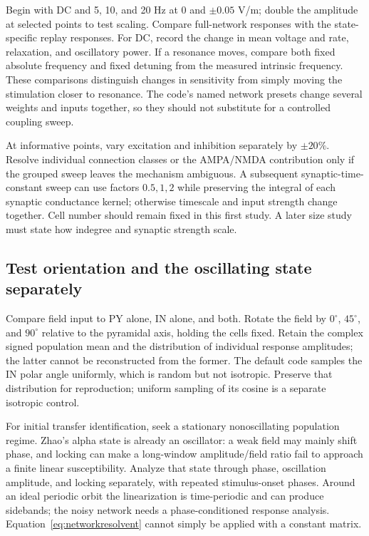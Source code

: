 \documentclass[11pt,a4paper]{article}
\begin{document}
Begin with DC and 5, 10, and 20 Hz at $0$ and $\pm0.05$ V/m; double the amplitude at selected points to test scaling. Compare full-network responses with the state-specific replay responses. For DC, record the change in mean voltage and rate, relaxation, and oscillatory power. If a resonance moves, compare both fixed absolute frequency and fixed detuning from the measured intrinsic frequency. These comparisons distinguish changes in sensitivity from simply moving the stimulation closer to resonance. The code's named network presets change several weights and inputs together, so they should not substitute for a controlled coupling sweep.

At informative points, vary excitation and inhibition separately by $\pm20\%$. Resolve individual connection classes or the AMPA/NMDA contribution only if the grouped sweep leaves the mechanism ambiguous. A subsequent synaptic-time-constant sweep can use factors $0.5,1,2$ while preserving the integral of each synaptic conductance kernel; otherwise timescale and input strength change together. Cell number should remain fixed in this first study. A later size study must state how indegree and synaptic strength scale.

\subsection{Test orientation and the oscillating state separately}

Compare field input to PY alone, IN alone, and both. Rotate the field by $0^\circ$, $45^\circ$, and $90^\circ$ relative to the pyramidal axis, holding the cells fixed. Retain the complex signed population mean and the distribution of individual response amplitudes; the latter cannot be reconstructed from the former. The default code samples the IN polar angle uniformly, which is random but not isotropic. Preserve that distribution for reproduction; uniform sampling of its cosine is a separate isotropic control.

For initial transfer identification, seek a stationary nonoscillating population regime. Zhao's alpha state is already an oscillator: a weak field may mainly shift phase, and locking can make a long-window amplitude/field ratio fail to approach a finite linear susceptibility. Analyze that state through phase, oscillation amplitude, and locking separately, with repeated stimulus-onset phases. Around an ideal periodic orbit the linearization is time-periodic and can produce sidebands; the noisy network needs a phase-conditioned response analysis. Equation~\eqref{eq:networkresolvent} cannot simply be applied with a constant matrix.
\end{document}
